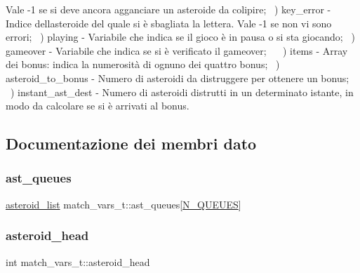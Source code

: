  Vale -\/1 se si deve ancora agganciare un asteroide da colipire; ~) key\+\_\+error -\/ Indice dell\textquotesingle{}asteroide del quale si è sbagliata la lettera. Vale -\/1 se non vi sono errori; ~) playing -\/ Variabile che indica se il gioco è in pausa o si sta giocando; ~) gameover -\/ Variabile che indica se si è verificato il gameover; ~\newline
 ~) items -\/ Array dei bonus\+: indica la numerosità di ognuno dei quattro bonus; ~) asteroid\+\_\+to\+\_\+bonus -\/ Numero di asteroidi da distruggere per ottenere un bonus; ~) instant\+\_\+ast\+\_\+dest -\/ Numero di asteroidi distrutti in un determinato istante, in modo da calcolare se si è arrivati al bonus. 

\subsection{Documentazione dei membri dato}
\mbox{\label{structmatch__vars__t_a71ec4212320d46caf051a7e61addbffe}} 
\subsubsection{\texorpdfstring{ast\+\_\+queues}{ast\_queues}}
{\footnotesize\ttfamily \hyperlink{data_8h_a452eef9acfcf76fb85e2c7ecf3b9ff90}{asteroid\+\_\+list} match\+\_\+vars\+\_\+t\+::ast\+\_\+queues\mbox{[}\hyperlink{data_8h_abbb1a97343fdbf54e75f14fb83cb0a92}{N\+\_\+\+Q\+U\+E\+U\+ES}\mbox{]}}

\mbox{\label{structmatch__vars__t_a19eb567824590a0ae36be4ed146c1a89}} 
\subsubsection{\texorpdfstring{asteroid\+\_\+head}{asteroid\_head}}
{\footnotesize\ttfamily int match\+\_\+vars\+\_\+t\+::asteroid\+\_\+head}

